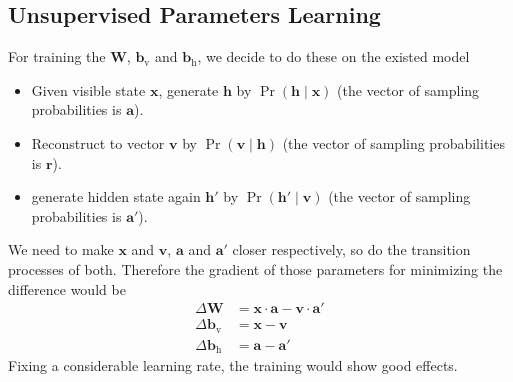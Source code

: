 \documentclass[10pt]{article}
\begin{document}
\subsection{Unsupervised Parameters Learning}
For training the $\mathbf{W}$, $\mathbf{b}_{\text{v}}$ and $\mathbf{b}_{\text{h}}$, we decide to do these on the existed model
\begin{itemize}
\item Given visible state $\mathbf{x}$, generate $\mathbf{h}$ by $\Pr\left(\mathbf{h} \mid \mathbf{x}\right)$ (the vector of sampling probabilities is $\mathbf{a}$).
\item Reconstruct to vector $\mathbf{v}$ by $\Pr\left(\mathbf{v} \mid \mathbf{h}\right)$ (the vector of sampling probabilities is $\mathbf{r}$).
\item generate hidden state again $\mathbf{h}'$ by $\Pr\left(\mathbf{h}' \mid \mathbf{v}\right)$ (the vector of sampling probabilities is $\mathbf{a}'$).
\end{itemize}
We need to make $\mathbf{x}$ and $\mathbf{v}$, $\mathbf{a}$ and $\mathbf{a}'$ closer respectively, so do the transition processes of both. Therefore the gradient of those parameters for minimizing the difference would be
\begin{align*}
\Delta\mathbf{W} &= \mathbf{x} \cdot \mathbf{a} - \mathbf{v} \cdot \mathbf{a}' \\
\Delta\mathbf{b}_{\text{v}} &= \mathbf{x} - \mathbf{v} \\
\Delta\mathbf{b}_{\text{h}} &= \mathbf{a} - \mathbf{a}'
\end{align*}
Fixing a considerable learning rate, the training would show good effects.
\end{document}

